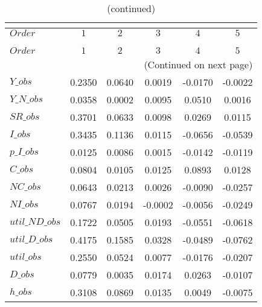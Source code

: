  
\begin{center}
\begin{longtable}{lccccc} 
\caption{COEFFICIENTS OF AUTOCORRELATION}\\
 \label{Table:th_autocorr_matrix}\\
\toprule 
$Order          $	 & 	 $         1$	 & 	 $         2$	 & 	 $         3$	 & 	 $         4$	 & 	 $         5$\\
\midrule \endfirsthead 
\caption{(continued)}\\
 \toprule \\ 
$Order          $	 & 	 $         1$	 & 	 $         2$	 & 	 $         3$	 & 	 $         4$	 & 	 $         5$\\
\midrule \endhead 
\midrule \multicolumn{6}{r}{(Continued on next page)} \\ \bottomrule \endfoot 
\bottomrule \endlastfoot 
$Y\_obs         $	 & 	    0.2350	 & 	    0.0640	 & 	    0.0019	 & 	   -0.0170	 & 	   -0.0022 \\ 
$Y\_N\_obs      $	 & 	    0.0358	 & 	    0.0002	 & 	    0.0095	 & 	    0.0510	 & 	    0.0016 \\ 
$SR\_obs        $	 & 	    0.3701	 & 	    0.0633	 & 	    0.0098	 & 	    0.0269	 & 	    0.0115 \\ 
$I\_obs         $	 & 	    0.3435	 & 	    0.1136	 & 	    0.0115	 & 	   -0.0656	 & 	   -0.0539 \\ 
$p\_I\_obs      $	 & 	    0.0125	 & 	    0.0086	 & 	    0.0015	 & 	   -0.0142	 & 	   -0.0119 \\ 
$C\_obs         $	 & 	    0.0804	 & 	    0.0105	 & 	    0.0125	 & 	    0.0893	 & 	    0.0128 \\ 
$NC\_obs        $	 & 	    0.0643	 & 	    0.0213	 & 	    0.0026	 & 	   -0.0090	 & 	   -0.0257 \\ 
$NI\_obs        $	 & 	    0.0767	 & 	    0.0194	 & 	   -0.0002	 & 	   -0.0056	 & 	   -0.0249 \\ 
$util\_ND\_obs  $	 & 	    0.1722	 & 	    0.0505	 & 	    0.0193	 & 	   -0.0551	 & 	   -0.0618 \\ 
$util\_D\_obs   $	 & 	    0.4175	 & 	    0.1585	 & 	    0.0328	 & 	   -0.0489	 & 	   -0.0762 \\ 
$util\_obs      $	 & 	    0.2550	 & 	    0.0524	 & 	    0.0077	 & 	   -0.0176	 & 	   -0.0207 \\ 
$D\_obs         $	 & 	    0.0779	 & 	    0.0035	 & 	    0.0174	 & 	    0.0263	 & 	   -0.0107 \\ 
$h\_obs         $	 & 	    0.3108	 & 	    0.0869	 & 	    0.0135	 & 	    0.0049	 & 	   -0.0075 \\ 
\end{longtable}
 \end{center}
